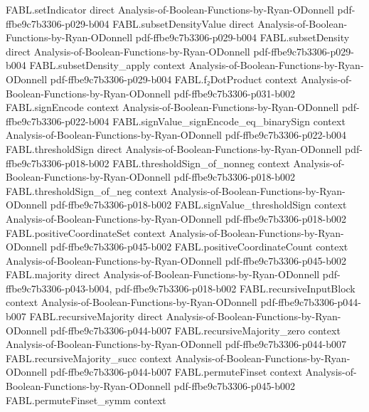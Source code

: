 \begin{theorem}
\proofstep
  {FABL.setIndicator}
  {direct}
  {Analysis-of-Boolean-Functions-by-Ryan-ODonnell}
  {pdf-ffbe9c7b3306-p029-b004}
\proofstep
  {FABL.subsetDensityValue}
  {direct}
  {Analysis-of-Boolean-Functions-by-Ryan-ODonnell}
  {pdf-ffbe9c7b3306-p029-b004}
\proofstep
  {FABL.subsetDensity}
  {direct}
  {Analysis-of-Boolean-Functions-by-Ryan-ODonnell}
  {pdf-ffbe9c7b3306-p029-b004}
\proofstep
  {FABL.subsetDensity_apply}
  {context}
  {Analysis-of-Boolean-Functions-by-Ryan-ODonnell}
  {pdf-ffbe9c7b3306-p029-b004}
\proofstep
  {FABL.f₂DotProduct}
  {context}
  {Analysis-of-Boolean-Functions-by-Ryan-ODonnell}
  {pdf-ffbe9c7b3306-p031-b002}
\proofstep
  {FABL.signEncode}
  {context}
  {Analysis-of-Boolean-Functions-by-Ryan-ODonnell}
  {pdf-ffbe9c7b3306-p022-b004}
\proofstep
  {FABL.signValue_signEncode_eq_binarySign}
  {context}
  {Analysis-of-Boolean-Functions-by-Ryan-ODonnell}
  {pdf-ffbe9c7b3306-p022-b004}
\proofstep
  {FABL.thresholdSign}
  {direct}
  {Analysis-of-Boolean-Functions-by-Ryan-ODonnell}
  {pdf-ffbe9c7b3306-p018-b002}
\proofstep
  {FABL.thresholdSign_of_nonneg}
  {context}
  {Analysis-of-Boolean-Functions-by-Ryan-ODonnell}
  {pdf-ffbe9c7b3306-p018-b002}
\proofstep
  {FABL.thresholdSign_of_neg}
  {context}
  {Analysis-of-Boolean-Functions-by-Ryan-ODonnell}
  {pdf-ffbe9c7b3306-p018-b002}
\proofstep
  {FABL.signValue_thresholdSign}
  {context}
  {Analysis-of-Boolean-Functions-by-Ryan-ODonnell}
  {pdf-ffbe9c7b3306-p018-b002}
\proofstep
  {FABL.positiveCoordinateSet}
  {context}
  {Analysis-of-Boolean-Functions-by-Ryan-ODonnell}
  {pdf-ffbe9c7b3306-p045-b002}
\proofstep
  {FABL.positiveCoordinateCount}
  {context}
  {Analysis-of-Boolean-Functions-by-Ryan-ODonnell}
  {pdf-ffbe9c7b3306-p045-b002}
\proofstep
  {FABL.majority}
  {direct}
  {Analysis-of-Boolean-Functions-by-Ryan-ODonnell}
  {pdf-ffbe9c7b3306-p043-b004,
    pdf-ffbe9c7b3306-p018-b002}
\proofstep
  {FABL.recursiveInputBlock}
  {context}
  {Analysis-of-Boolean-Functions-by-Ryan-ODonnell}
  {pdf-ffbe9c7b3306-p044-b007}
\proofstep
  {FABL.recursiveMajority}
  {direct}
  {Analysis-of-Boolean-Functions-by-Ryan-ODonnell}
  {pdf-ffbe9c7b3306-p044-b007}
\proofstep
  {FABL.recursiveMajority_zero}
  {context}
  {Analysis-of-Boolean-Functions-by-Ryan-ODonnell}
  {pdf-ffbe9c7b3306-p044-b007}
\proofstep
  {FABL.recursiveMajority_succ}
  {context}
  {Analysis-of-Boolean-Functions-by-Ryan-ODonnell}
  {pdf-ffbe9c7b3306-p044-b007}
\proofstep
  {FABL.permuteFinset}
  {context}
  {Analysis-of-Boolean-Functions-by-Ryan-ODonnell}
  {pdf-ffbe9c7b3306-p045-b002}
\proofstep
  {FABL.permuteFinset_symm}
  {context}

\end{theorem}
